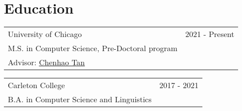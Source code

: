 
\section{Education}





\begin{tabularx}{\linewidth}{@{}l r@{}}	




University of Chicago   &     \hspace{68mm} 2021 - Present\\
M.S. in Computer Science, Pre-Doctoral program \\
Advisor: \href{https://chenhaot.com/}{Chenhao Tan} \\ 
\end{tabularx}






\begin{tabularx}{\linewidth}{@{}l r@{}}	
Carleton College        &   \hspace{87mm} 2017 - 2021         \\
B.A. in Computer Science and Linguistics 



\end{tabularx}